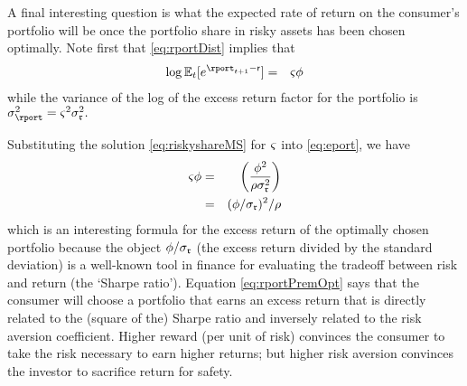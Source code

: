 \begin{comment} %
This formula hints at the existence of an `equity premium puzzle'
(\cite{mehra&prescott:puzzle}).  Interpreting the risky asset as the
aggregate stock market, the annual standard deviation of the log of
U.S.\ stock returns has historically been about $\sigma_{\risky}=0.2$
yielding $\Evarr = 0.04$.  The equity premium over historical periods
has been something like $\eprem = 0.08$ (eight percent).  With risk
aversion of $\CRRA=2$ this formula implies that the share of risky
assets in your portfolio should be $0.08/0.08$ or 100 percent!  The
fact that most people have less than 100 percent of their wealth
invested in stocks is the `stockholding puzzle,' the microeconomic
manifestation of the equity premium puzzle
(\cite{haliassos&bertaut:fewholdstocks}).
\end{comment}

A final interesting question is what the expected rate of return on
the consumer's portfolio will be once the portfolio share in risky
assets has been chosen optimally.  Note first that \eqref{eq:rportDist}
implies that
\begin{eqnarray}
  \log \Ex_{t}[e^{\rport_{t+1}-\rfree}] & = & \riskyshare \eprem  \label{eq:eport}
\end{eqnarray}
while the variance of the log of the excess return factor for the portfolio is $\sigma^{2}_{\rport} = \riskyshare^{2} \sigma^{2}_{\risky}.$

Substituting the solution \eqref{eq:riskyshareMS} for ${\varsigma}$ into \eqref{eq:eport}, we have
\begin{eqnarray}
  {\varsigma} \phi & = & \left(\frac{\phi^{2}}{\rho \sigma_{\mathfrak{r}}^{2}}\right)  \notag
\\ & = &  (\phi/\sigma_{\mathfrak{r}})^{2}/\rho \label{eq:rportPremOpt}
\end{eqnarray}
which is an interesting formula for the excess return of the optimally
chosen portfolio because the object $\phi/\sigma_{\mathfrak{r}}$ (the
excess return divided by the standard deviation) is a well-known tool
in finance for evaluating the tradeoff between risk and return (the
`Sharpe ratio').  Equation \eqref{eq:rportPremOpt} says that the consumer will
choose a portfolio that earns an excess return that is directly
related to the (square of the) Sharpe ratio and inversely related to the risk aversion
coefficient.  Higher reward (per unit of risk) convinces the consumer
to take the risk necessary to earn higher returns; but higher risk
aversion convinces the investor to sacrifice return for safety.

